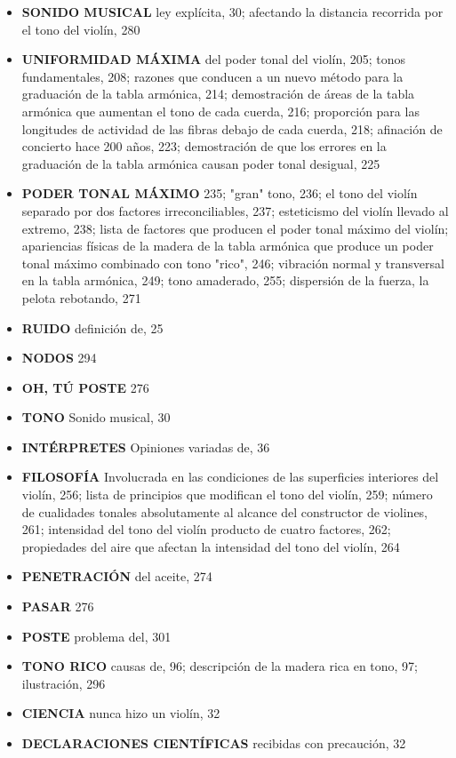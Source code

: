 \documentclass[12pt]{book}
\begin{document}
\begin{itemize}
    \item \textbf{SONIDO MUSICAL} ley explícita, 30; afectando la distancia recorrida por el tono del violín, 280
    \item \textbf{UNIFORMIDAD MÁXIMA} del poder tonal del violín, 205; tonos fundamentales, 208; razones que conducen a un nuevo método para la graduación de la tabla armónica, 214; demostración de áreas de la tabla armónica que aumentan el tono de cada cuerda, 216; proporción para las longitudes de actividad de las fibras debajo de cada cuerda, 218; afinación de concierto hace 200 años, 223; demostración de que los errores en la graduación de la tabla armónica causan poder tonal desigual, 225
    \item \textbf{PODER TONAL MÁXIMO} 235; "gran" tono, 236; el tono del violín separado por dos factores irreconciliables, 237; esteticismo del violín llevado al extremo, 238; lista de factores que producen el poder tonal máximo del violín; apariencias físicas de la madera de la tabla armónica que produce un poder tonal máximo combinado con tono "rico", 246; vibración normal y transversal en la tabla armónica, 249; tono amaderado, 255; dispersión de la fuerza, la pelota rebotando, 271
    \item \textbf{RUIDO} definición de, 25
    \item \textbf{NODOS} 294
    \item \textbf{OH, TÚ POSTE} 276
    \item \textbf{TONO} Sonido musical, 30
    \item \textbf{INTÉRPRETES} Opiniones variadas de, 36
    \item \textbf{FILOSOFÍA} Involucrada en las condiciones de las superficies interiores del violín, 256; lista de principios que modifican el tono del violín, 259; número de cualidades tonales absolutamente al alcance del constructor de violines, 261; intensidad del tono del violín producto de cuatro factores, 262; propiedades del aire que afectan la intensidad del tono del violín, 264
    \item \textbf{PENETRACIÓN} del aceite, 274
    \item \textbf{PASAR} 276
    \item \textbf{POSTE} problema del, 301
    \item \textbf{TONO RICO} causas de, 96; descripción de la madera rica en tono, 97; ilustración, 296
    \item \textbf{CIENCIA} nunca hizo un violín, 32
    \item \textbf{DECLARACIONES CIENTÍFICAS} recibidas con precaución, 32

\end{itemize}
\end{document}
